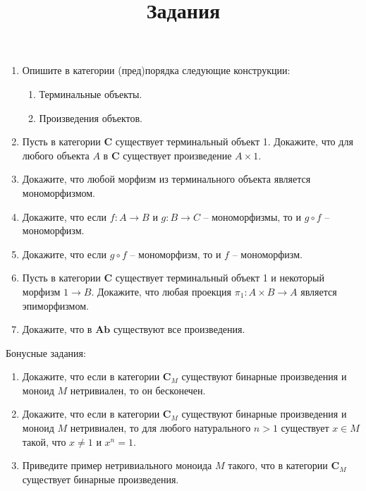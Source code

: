 \documentclass[draft]{article}
\newcommand{\cat}[1]{\mathbf{#1}}
\renewcommand{\C}{\cat{C}}
\newcommand{\Ab}{\cat{Ab}}
\begin{document}
\title{Задания}
\maketitle

\begin{enumerate}

\item Опишите в категории (пред)порядка следующие конструкции:
\begin{enumerate}
\item Терминальные объекты.
\item Произведения объектов.
\end{enumerate}

\item Пусть в категории $\C$ существует терминальный объект 1.
Докажите, что для любого объекта $A$ в $\C$ существует произведение $A \times 1$.

\item Докажите, что любой морфизм из терминального объекта является мономорфизмом.

\item Докажите, что если $f : A \to B$ и $g : B \to C$ -- мономорфизмы, то и $g \circ f$ -- мономорфизм.

\item Докажите, что если $g \circ f$ -- мономорфизм, то и $f$ -- мономорфизм.

\item Пусть в категории $\C$ существует терминальный объект 1 и некоторый морфизм $1 \to B$.
Докажите, что любая проекция $\pi_1 : A \times B \to A$ является эпиморфизмом.

\item Докажите, что в $\Ab$ существуют все произведения.

\end{enumerate}

Бонусные задания:

\begin{enumerate}

\item Докажите, что если в категории $\C_M$ существуют бинарные произведения и моноид $M$ нетривиален, то он бесконечен.

\item Докажите, что если в категории $\C_M$ существуют бинарные произведения и моноид $M$ нетривиален, то для любого натурального $n > 1$ существует $x \in M$ такой, что $x \neq 1$ и $x^n = 1$.

\item Приведите пример нетривиального моноида $M$ такого, что в категории $\C_M$ существует бинарные произведения.

\end{enumerate}
\end{document}
